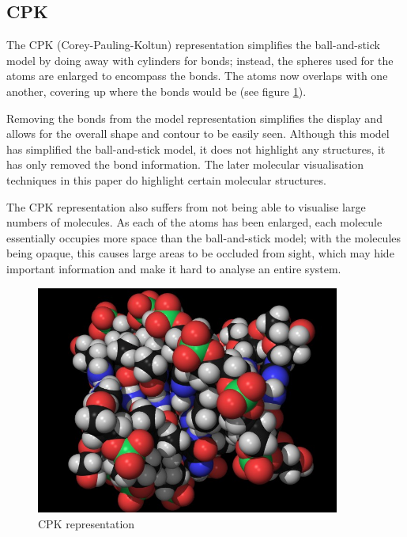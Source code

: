 
\subsection{CPK}
\label{sub:background_cpk}

The CPK (Corey-Pauling-Koltun) \citep{corey53} representation simplifies the
ball-and-stick model by doing away with cylinders for bonds; instead, the
spheres used for the atoms are enlarged to encompass the bonds. The atoms now
overlaps with one another, covering up where the bonds would be (see figure
\ref{fig:background_cpk}).

Removing the bonds from the model representation simplifies the display and
allows for the overall shape and contour to be easily seen. Although this model
has simplified the ball-and-stick model, it does not highlight any structures,
it has only removed the bond information. The later molecular visualisation
techniques in this paper do highlight certain molecular structures.

The CPK representation also suffers from not being able to visualise large
numbers of molecules. As each of the atoms has been enlarged, each molecule
essentially occupies more space than the ball-and-stick model; with the
molecules being opaque, this causes large areas to be occluded from sight, which
may hide important information and make it hard to analyse an entire system.

\begin{figure}[h!]
  \begin{center}
    \includegraphics[width=100mm]{CPK-big}
  \end{center}
  \caption{CPK representation}
  \label{fig:background_cpk}
\end{figure}


